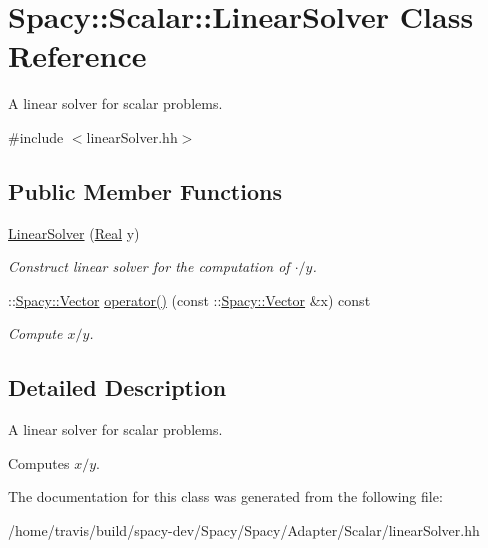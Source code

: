 \hypertarget{classSpacy_1_1Scalar_1_1LinearSolver}{\section{\-Spacy\-:\-:\-Scalar\-:\-:\-Linear\-Solver \-Class \-Reference}
\label{classSpacy_1_1Scalar_1_1LinearSolver}
}


\-A linear solver for scalar problems.  




{\ttfamily \#include $<$linear\-Solver.\-hh$>$}

\subsection*{\-Public \-Member \-Functions}
\begin{DoxyCompactItemize}
\item 
\hypertarget{classSpacy_1_1Scalar_1_1LinearSolver_af7d7759b5ee27d7a16640baf1fa663d9}{\hyperlink{classSpacy_1_1Scalar_1_1LinearSolver_af7d7759b5ee27d7a16640baf1fa663d9}{\-Linear\-Solver} (\hyperlink{classSpacy_1_1Real}{\-Real} y)}\label{classSpacy_1_1Scalar_1_1LinearSolver_af7d7759b5ee27d7a16640baf1fa663d9}

\begin{DoxyCompactList}\small\item\em \-Construct linear solver for the computation of $\cdot/y$. \end{DoxyCompactList}\item 
\hypertarget{classSpacy_1_1Scalar_1_1LinearSolver_a2acd32e9eede5a5e868c85a8f62b757b}{\-::\hyperlink{classSpacy_1_1Vector}{\-Spacy\-::\-Vector} \hyperlink{classSpacy_1_1Scalar_1_1LinearSolver_a2acd32e9eede5a5e868c85a8f62b757b}{operator()} (const \-::\hyperlink{classSpacy_1_1Vector}{\-Spacy\-::\-Vector} \&x) const }\label{classSpacy_1_1Scalar_1_1LinearSolver_a2acd32e9eede5a5e868c85a8f62b757b}

\begin{DoxyCompactList}\small\item\em \-Compute $x/y$. \end{DoxyCompactList}\end{DoxyCompactItemize}


\subsection{\-Detailed \-Description}
\-A linear solver for scalar problems. 

\-Computes $x/y$. 

\-The documentation for this class was generated from the following file\-:\begin{DoxyCompactItemize}
\item 
/home/travis/build/spacy-\/dev/\-Spacy/\-Spacy/\-Adapter/\-Scalar/linear\-Solver.\-hh\end{DoxyCompactItemize}
